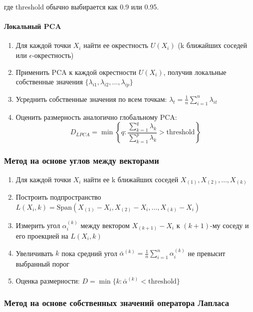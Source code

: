 \documentclass[a4paper,12pt]{article}
\begin{document}
где threshold обычно выбирается как 0.9 или 0.95.

\paragraph{Локальный PCA}

\begin{enumerate}
    \item Для каждой точки $X_i$ найти ее окрестность $U(X_i)$ (k ближайших соседей или $\epsilon$-окрестность)
    \item Применить PCA к каждой окрестности $U(X_i)$, получив локальные собственные значения $\{\lambda_{i1}, \lambda_{i2}, \ldots, \lambda_{ip}\}$
    \item Усреднить собственные значения по всем точкам: $\lambda_t = \frac{1}{n} \sum_{i=1}^n \lambda_{it}$
    \item Оценить размерность аналогично глобальному PCA:
    \begin{equation}
        D_{LPCA} = \min\left\{q: \frac{\sum_{k=1}^q \lambda_k}{\sum_{k=1}^p \lambda_k} > \text{threshold}\right\}
    \end{equation}
\end{enumerate}

\subsubsection{Метод на основе углов между векторами}

\begin{enumerate}
    \item Для каждой точки $X_i$ найти ее k ближайших соседей $X_{(1)}, X_{(2)}, \ldots, X_{(k)}$
    \item Построить подпространство $L(X_i, k) = \text{Span}(X_{(1)}-X_i, X_{(2)}-X_i, \ldots, X_{(k)}-X_i)$
    \item Измерить угол $\alpha_i^{(k)}$ между вектором $X_{(k+1)}-X_i$ к $(k+1)$-му соседу и его проекцией на $L(X_i, k)$
    \item Увеличивать $k$ пока средний угол $\bar{\alpha}^{(k)} = \frac{1}{n} \sum_{i=1}^n \alpha_i^{(k)}$ не превысит выбранный порог
    \item Оценка размерности: $D = \min\{k: \bar{\alpha}^{(k)} < \text{threshold}\}$
\end{enumerate}

\subsubsection{Метод на основе собственных значений оператора Лапласа}
\end{document}
